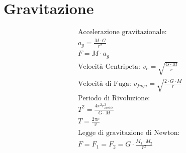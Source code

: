 \section{Gravitazione}

\begin{gather*}
    \text{Accelerazione gravitazionale: } \\ a_g = \frac{M\cdot G}{r^2} \\
    F = M \cdot a_g \\
    \text{Velocità Centripeta: } v_c= \sqrt{\frac{G \cdot M}{r}} \\
    \text{Velocità di Fuga: } v_{fuga}=\sqrt{\frac{2 \cdot G \cdot M}{r}} \\
    \text{Periodo di Rivoluzione}: \\ T^2 = \frac{4 \pi^2 r^3_{orbita}}{G \cdot M} \\ T = \frac{2 \pi r}{v_{}}\\
    \text{Legge di gravitazione di Newton}: \\ F=F_1=F_2 = G\cdot\frac{M_1\cdot M_2}{r^2}
\end{gather*}